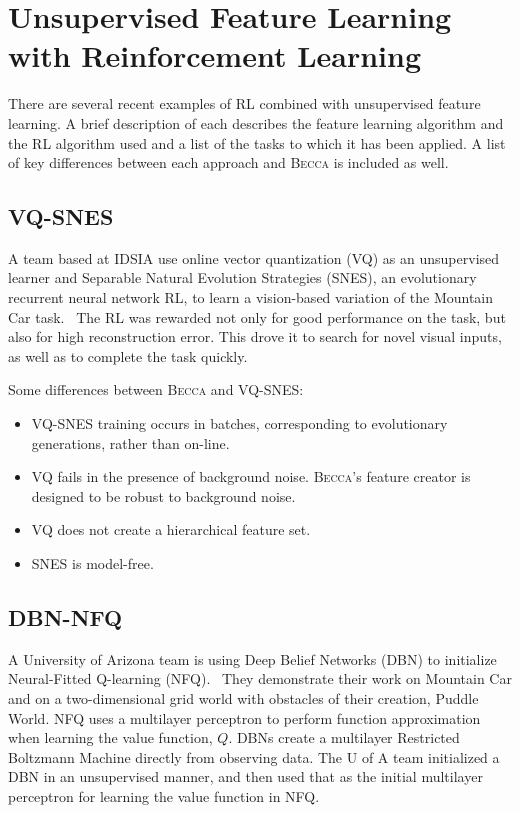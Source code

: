 \section{Unsupervised Feature Learning with Reinforcement Learning}
There are several recent examples of RL combined with unsupervised feature learning. A brief description of each describes the feature learning algorithm and the RL algorithm used and a list of the tasks to which it has been applied. A list of key differences between each approach and \textsc{Becca} is included as well.

\subsection{VQ-SNES} 
A team based at IDSIA use online vector quantization (VQ) as an unsupervised learner and Separable Natural Evolution Strategies (SNES), an evolutionary recurrent neural network RL, to learn a vision-based variation of the Mountain Car task.~\cite{cuccu11} The RL was rewarded not only for good performance on the task, but also for high reconstruction error. This drove it to search for novel visual inputs, as well as to complete the task quickly.

Some differences between \textsc{Becca} and VQ-SNES:
\begin{itemize}
\item VQ-SNES training occurs in batches, corresponding to evolutionary generations, rather than on-line.
\item VQ fails in the presence of background noise. \textsc{Becca}'s feature creator is designed to be robust to background noise.
\item VQ does not create a hierarchical feature set.
\item SNES is model-free.
\end{itemize}

\subsection{DBN-NFQ} 
A University of Arizona team is using Deep Belief Networks (DBN) to initialize Neural-Fitted Q-learning (NFQ).~\cite{abtahi11} They demonstrate their work on Mountain Car and on a two-dimensional grid world with obstacles of their creation, Puddle World. NFQ uses a multilayer perceptron to perform function approximation when learning the value function, $Q$. DBNs create a multilayer Restricted Boltzmann Machine directly from observing data. The U of A team initialized a DBN in an unsupervised manner, and then used that as the initial multilayer perceptron for learning the value function in NFQ.

